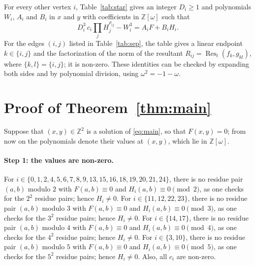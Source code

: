 \documentclass[11pt]{article}
\newcommand{\Z}{\mathbb{Z}}
\begin{document}
For every other vertex $i$, Table~\ref{tab:star} gives an integer $D_i\geq1$ and polynomials $W_i$, $A_i$ and $B_i$ in $x$ and $y$ with coefficients in $\Z[\omega]$ such that
\begin{equation}\label{eq:star}
D_i^3\,c_i\prod_jH_j^{\rho_{ij}}-W_i^3=A_iF+B_iH_i.
\end{equation}
For the edges $(i,j)$ listed in Table~\ref{tab:sep}, the table gives a linear endpoint $k\in\{i,j\}$ and the factorization of the norm of the resultant $R_{ij}=\operatorname{Res}_t(f_k,g_{kl})$, where $\{k,l\}=\{i,j\}$; it is non-zero.
These identities can be checked by expanding both sides and by polynomial division, using $\omega^2=-1-\omega$.

\section{Proof of Theorem~\ref{thm:main}}

Suppose that $(x,y)\in\Z^2$ is a solution of \eqref{eq:main}, so that $F(x,y)=0$; from now on the polynomials denote their values at $(x,y)$, which lie in $\Z[\omega]$.
\paragraph{Step 1: the values are non-zero.} For $i\in\{0,\allowbreak 1,\allowbreak 2,\allowbreak 4,\allowbreak 5,\allowbreak 6,\allowbreak 7,\allowbreak 8,\allowbreak 9,\allowbreak 13,\allowbreak 15,\allowbreak 16,\allowbreak 18,\allowbreak 19,\allowbreak 20,\allowbreak 21,\allowbreak 24\}$, there is no residue pair $(a,b)$ modulo $2$ with $F(a,b)\equiv0$ and $H_i(a,b)\equiv0\pmod{2}$, as one checks for the $2^2$ residue pairs; hence $H_i\neq0$. For $i\in\{11,\allowbreak 12,\allowbreak 22,\allowbreak 23\}$, there is no residue pair $(a,b)$ modulo $3$ with $F(a,b)\equiv0$ and $H_i(a,b)\equiv0\pmod{3}$, as one checks for the $3^2$ residue pairs; hence $H_i\neq0$. For $i\in\{14,\allowbreak 17\}$, there is no residue pair $(a,b)$ modulo $4$ with $F(a,b)\equiv0$ and $H_i(a,b)\equiv0\pmod{4}$, as one checks for the $4^2$ residue pairs; hence $H_i\neq0$. For $i\in\{3,\allowbreak 10\}$, there is no residue pair $(a,b)$ modulo $5$ with $F(a,b)\equiv0$ and $H_i(a,b)\equiv0\pmod{5}$, as one checks for the $5^2$ residue pairs; hence $H_i\neq0$. Also, all $c_i$ are non-zero.
\end{document}
